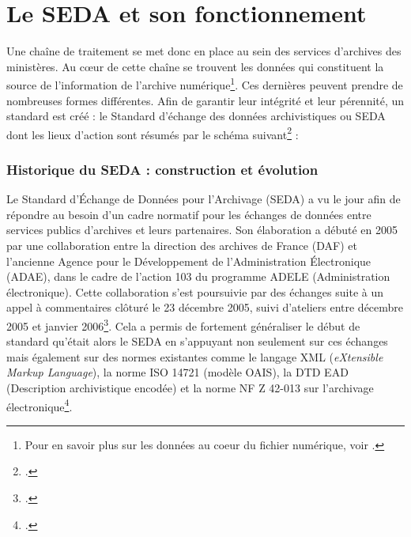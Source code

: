 \chapter{Le SEDA et son fonctionnement}

Une chaîne de traitement se met donc en place au sein des services d’archives des ministères. Au cœur de cette chaîne se trouvent les données qui constituent la source de l’information de l’archive numérique\footnote{Pour en savoir plus sur les données au coeur du fichier numérique, voir \cite[pp.253-256]{nguyen_chapitre_2020}.}. Ces dernières peuvent prendre de nombreuses formes différentes. Afin de garantir leur intégrité et leur pérennité, un standard est créé : le Standard d’échange des données archivistiques ou \gls{SEDA} dont les lieux d'action sont résumés par le schéma suivant\footcite{nichele_formation_2022} : 



\subsection{Historique du SEDA : construction et évolution}
Le Standard d'Échange de Données pour l'Archivage (\gls{SEDA}) a vu le jour afin de répondre au besoin d’un cadre normatif pour les échanges de données entre services publics d’archives et leurs partenaires. Son élaboration a débuté en 2005 par une collaboration entre la direction des archives de France (DAF) et l'ancienne Agence pour le Développement de l'Administration Électronique (ADAE), dans le cadre de l'action 103 du programme ADELE (Administration électronique). Cette collaboration s’est poursuivie par des échanges suite à un appel à commentaires clôturé le 23 décembre 2005, suivi d'ateliers entre décembre 2005 et janvier 2006\footcite{cines_oais_2019}. Cela a permis de fortement généraliser le début de standard qu’était alors le \gls{SEDA} en s'appuyant non seulement sur ces échanges mais également sur des normes existantes comme le langage \gls{XML} (\textit{eXtensible Markup Language}), la norme ISO 14721 (modèle \gls{OAIS}), la \gls{DTD} \gls{EAD} (Description archivistique encodée) et la norme NF Z 42-013 sur l’archivage électronique\footcite[p.63]{gueit-montchal_chapitre_2020}.  


